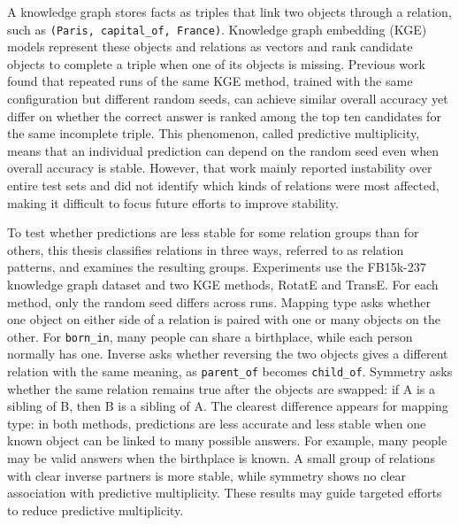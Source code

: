\documentclass[master,english]{kuisthesis}	%
\date{July 2026}		%
\theoremstyle{plain}
\theoremstyle{definition}
\theoremstyle{remark}
\begin{document}
\maketitle                  %


\begin{eabstract}
A knowledge graph stores facts as triples that link two objects through a
relation, such as \texttt{(Paris, capital\_of, France)}.
Knowledge graph embedding (KGE) models represent these objects and relations as
vectors and rank candidate objects to complete a triple when one of its objects
is missing. Previous work found that repeated runs of the same KGE method,
trained with the same configuration but different random seeds, can achieve
similar overall accuracy yet differ on whether the correct answer is ranked
among the top ten candidates for the same incomplete triple. This phenomenon,
called predictive multiplicity, means that an individual prediction can depend
on the random seed even when overall accuracy is stable. However, that work
mainly reported instability over entire test sets and did not identify which
kinds of relations were most affected, making it difficult to focus future
efforts to improve stability.

To test whether predictions are less stable for some relation groups than for
others, this thesis classifies relations in three ways, referred to as relation
patterns, and examines the resulting groups. Experiments use the FB15k-237
knowledge graph dataset and two KGE methods, RotatE and TransE. For each method,
only the random seed differs across runs.
Mapping type asks whether one object on either side of a relation is paired
with one or many objects on the other. For \texttt{born\_in}, many people can
share a birthplace, while each person normally has one. Inverse asks whether
reversing the two objects gives a different relation with the same meaning, as
\texttt{parent\_of} becomes \texttt{child\_of}. Symmetry asks whether the same
relation remains true after the objects are swapped: if A is a sibling of B,
then B is a sibling of A. The clearest difference appears for mapping type:
in both methods, predictions are less accurate and less stable when one known
object can be linked to many possible answers. For example, many people may be
valid answers when the birthplace is known. A small group of relations with
clear inverse partners is more stable, while symmetry shows no clear
association with predictive multiplicity. These results may guide targeted
efforts to reduce predictive multiplicity.
\end{eabstract}

\tableofcontents			%








% 

\end{document}
